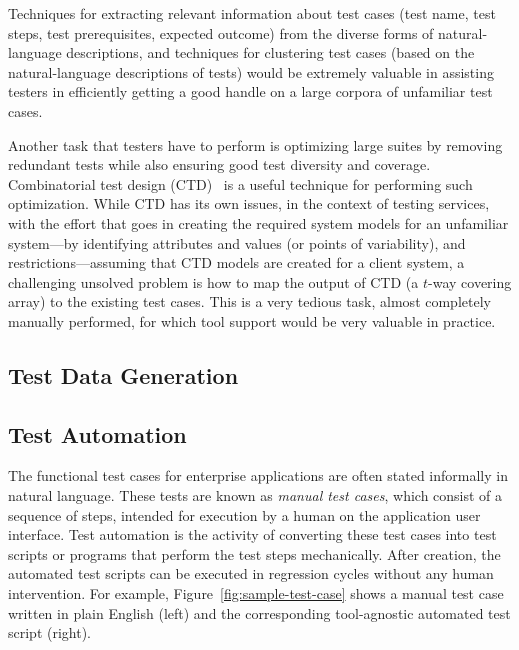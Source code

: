 Techniques for extracting relevant information about test cases (\eg test name,
test steps, test prerequisites, expected outcome) from the diverse forms of
natural-language descriptions, and techniques for clustering test cases (based
on the natural-language descriptions of tests) would be extremely valuable in
assisting testers in efficiently getting a good handle on a large corpora of
unfamiliar test cases.

Another task that testers have to perform is optimizing large suites by removing
redundant tests while also ensuring good test diversity and
coverage. Combinatorial test design (CTD)~\cite{Cohen:1996, Cohen:1997,
  Cohen:2003} is a useful technique for performing such optimization. While CTD
has its own issues, in the context of testing services, with the effort that
goes in creating the required system models for an unfamiliar system---by
identifying attributes and values (or points of variability), and
restrictions---assuming that CTD models are created for a client system, a
challenging unsolved problem is how to map the output of CTD (\ie a $t$-way
covering array) to the existing test cases. This is a very tedious task, almost
completely manually performed, for which tool support would be very valuable in
practice.

\subsection{Test Data Generation}
\label{sec:test-data}



\subsection{Test Automation}
\label{sec:test-automation}

The functional test cases for enterprise applications are often stated
informally in natural language. These tests are known as \textit{manual test
  cases}, which consist of a sequence of steps, intended for execution by a
human on the application user interface.  Test automation is the activity of
converting these test cases into test scripts or programs that perform the test
steps mechanically. After creation, the automated test scripts can be executed
in regression cycles without any human intervention. For example,
Figure~\ref{fig:sample-test-case} shows a manual test case written in plain
English (left) and the corresponding tool-agnostic automated test script
(right).

